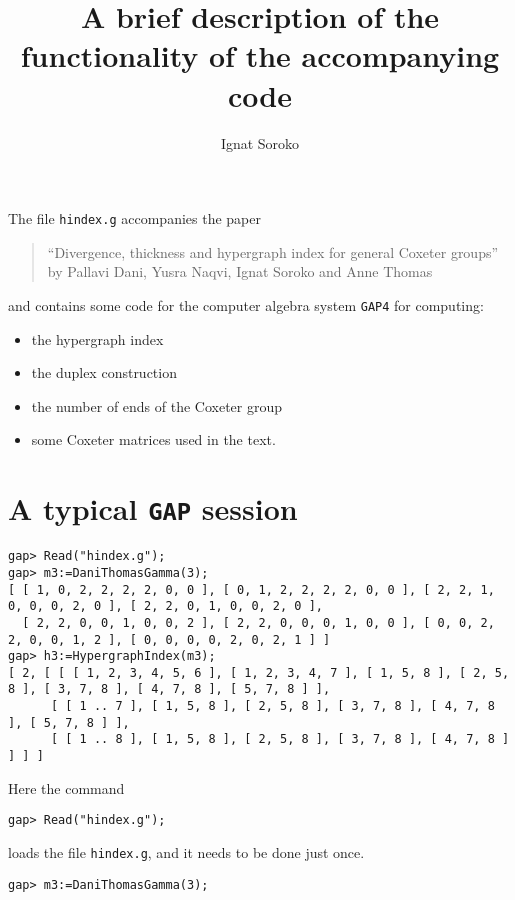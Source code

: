 \documentclass[10pt]{amsart}
\begin{document}
\author{Ignat Soroko}
\title{A brief description of the functionality of the accompanying code}
\maketitle

\noindent
The file {\tt hindex.g} accompanies the paper
\begin{quote}
``Divergence, thickness and hypergraph index for general Coxeter groups'' by Pallavi Dani, Yusra Naqvi, Ignat Soroko and Anne Thomas
\end{quote}
and contains some code for the computer algebra system {\tt GAP4} for computing:
\begin{itemize}
\item the hypergraph index
\item the duplex construction
\item the number of ends of the Coxeter group
\item some Coxeter matrices used in the text.
\end{itemize}

\bigskip

\section{A typical {\tt GAP} session}

{\footnotesize
\begin{verbatim}
gap> Read("hindex.g");
gap> m3:=DaniThomasGamma(3);
[ [ 1, 0, 2, 2, 2, 2, 0, 0 ], [ 0, 1, 2, 2, 2, 2, 0, 0 ], [ 2, 2, 1, 0, 0, 0, 2, 0 ], [ 2, 2, 0, 1, 0, 0, 2, 0 ], 
  [ 2, 2, 0, 0, 1, 0, 0, 2 ], [ 2, 2, 0, 0, 0, 1, 0, 0 ], [ 0, 0, 2, 2, 0, 0, 1, 2 ], [ 0, 0, 0, 0, 2, 0, 2, 1 ] ]
gap> h3:=HypergraphIndex(m3);
[ 2, [ [ [ 1, 2, 3, 4, 5, 6 ], [ 1, 2, 3, 4, 7 ], [ 1, 5, 8 ], [ 2, 5, 8 ], [ 3, 7, 8 ], [ 4, 7, 8 ], [ 5, 7, 8 ] ], 
      [ [ 1 .. 7 ], [ 1, 5, 8 ], [ 2, 5, 8 ], [ 3, 7, 8 ], [ 4, 7, 8 ], [ 5, 7, 8 ] ], 
      [ [ 1 .. 8 ], [ 1, 5, 8 ], [ 2, 5, 8 ], [ 3, 7, 8 ], [ 4, 7, 8 ] ] ] ] 
\end{verbatim}
}

\bigskip\noindent
Here the command 
{\footnotesize
\begin{verbatim}
gap> Read("hindex.g");
\end{verbatim}}\noindent
loads the file {\tt hindex.g}, and it needs to be done just once.

\medskip\noindent
{\footnotesize
\begin{verbatim}
gap> m3:=DaniThomasGamma(3);
\end{verbatim}}
\end{document}
